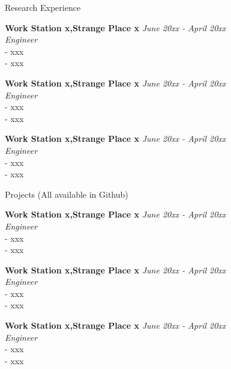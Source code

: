 \documentclass{resume} %
\begin{document}
\begin{rSection}{Research Experience}

{\bf Work Station x,Strange Place x} \hfill {\em June 20xx - April 20xx} 
\\{\textit{ Engineer}}
\\- xxx
\\- xxx

{\bf Work Station x,Strange Place x} \hfill {\em June 20xx - April 20xx} 
\\{\textit{ Engineer}}
\\- xxx
\\- xxx

{\bf Work Station x,Strange Place x} \hfill {\em June 20xx - April 20xx} 
\\{\textit{ Engineer}}
\\- xxx
\\- xxx


\end{rSection}


\begin{rSection}{Projects (All available in Github)}

{\bf Work Station x,Strange Place x} \hfill {\em June 20xx - April 20xx} 
\\{\textit{ Engineer}}
\\- xxx
\\- xxx

{\bf Work Station x,Strange Place x} \hfill {\em June 20xx - April 20xx} 
\\{\textit{ Engineer}}
\\- xxx
\\- xxx

{\bf Work Station x,Strange Place x} \hfill {\em June 20xx - April 20xx} 
\\{\textit{ Engineer}}
\\- xxx
\\- xxx



\end{rSection}
\end{document}
